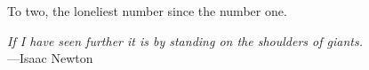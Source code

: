 %
\begin{frontmatter}

%
%
\makefrontmatter

%
%
%
%
%
%
\begin{dedication}
  To two, the loneliest number since the number one.
\end{dedication}


%
%



%
%
\begin{epigraph} %
  \emph{If I have seen further it is by standing on the shoulders of giants.}\\
  ---Isaac Newton
\end{epigraph}

%


%
\tableofcontents
\listoffigures  %




\end{frontmatter}
